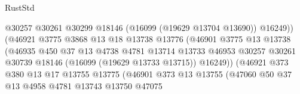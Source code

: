 \begin{lexlean}{RustStd}
\begin{coremodule}
                                          @30257
                                          @30261
                                          @30299
                                          @18146
                                          (@16099 (@19629 @13704 @13690))
                                          @16249))
                                      (@46921
                                        @3775
                                        @3868
                                        @13
                                        @18
                                        @13738
                                        @13776
                                        (@46901
                                          @3775
                                          @13
                                          @13738
                                          (@46935
                                            @450
                                            @37
                                            @13
                                            @4738
                                            @4781
                                            @13714
                                            @13733
                                            @46953
                                            @30257
                                            @30261
                                            @30739
                                            @18146
                                            (@16099 (@19629 @13733 @13715))
                                            @16249))
                                        (@46921
                                          @373
                                          @380
                                          @13
                                          @17
                                          @13755
                                          @13775
                                          (@46901
                                            @373
                                            @13
                                            @13755
                                            (@47060
                                              @50
                                              @37
                                              @13
                                              @4958
                                              @4781
                                              @13743
                                              @13750
                                              @47075

\end{coremodule}
\end{lexlean}
